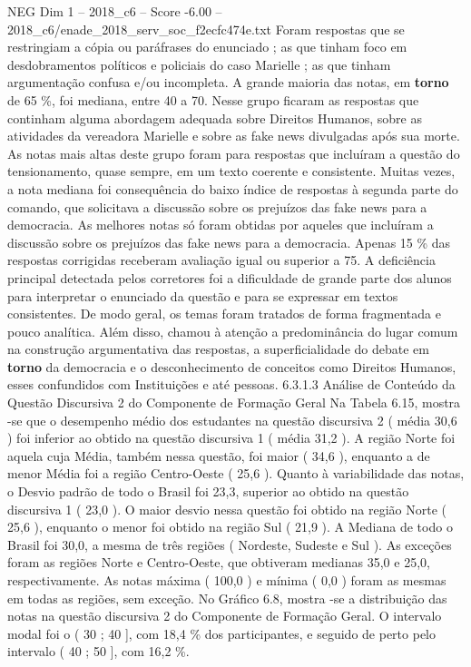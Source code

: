 \begin{textsample}{NEG Dim 1 – 2018\_c6 – Score -6.00 – 2018\_c6/enade\_2018\_serv\_soc\_f2ecfc474e.txt}
Foram respostas que se restringiam a cópia ou paráfrases do enunciado ; as que tinham foco em desdobramentos políticos e policiais do caso Marielle ; as que tinham argumentação confusa e/ou incompleta.
A grande maioria das notas, em \textbf{torno} de 65 \%, foi mediana, entre 40 a 70.
Nesse grupo ficaram as respostas que continham alguma abordagem adequada sobre Direitos Humanos, sobre as atividades da vereadora Marielle e sobre as fake news divulgadas após sua morte.
As notas mais altas deste grupo foram para respostas que incluíram a questão do tensionamento, quase sempre, em um texto coerente e consistente.
Muitas vezes, a nota mediana foi consequência do baixo índice de respostas à segunda parte do comando, que solicitava a discussão sobre os prejuízos das fake news para a democracia.
As melhores notas só foram obtidas por aqueles que incluíram a discussão sobre os prejuízos das fake news para a democracia.
Apenas 15 \% das respostas corrigidas receberam avaliação igual ou superior a 75.
A deficiência principal detectada pelos corretores foi a dificuldade de grande parte dos alunos para interpretar o enunciado da questão e para se expressar em textos consistentes.
De modo geral, os temas foram tratados de forma fragmentada e pouco analítica.
Além disso, chamou à atenção a predominância do lugar comum na construção argumentativa das respostas, a superficialidade do debate em \textbf{torno} da democracia e o desconhecimento de conceitos como Direitos Humanos, esses confundidos com Instituições e até pessoas. 6.3.1.3 Análise de Conteúdo da Questão Discursiva 2 do Componente de Formação Geral Na Tabela 6.15, mostra -se que o desempenho médio dos estudantes na questão discursiva 2 ( média 30,6 ) foi inferior ao obtido na questão discursiva 1 ( média 31,2 ).
A região Norte foi aquela cuja Média, também nessa questão, foi maior ( 34,6 ), enquanto a de menor Média foi a região Centro-Oeste ( 25,6 ).
Quanto à variabilidade das notas, o Desvio padrão de todo o Brasil foi 23,3, superior ao obtido na questão discursiva 1 ( 23,0 ).
O maior desvio nessa questão foi obtido na região Norte ( 25,6 ), enquanto o menor foi obtido na região Sul ( 21,9 ).
A Mediana de todo o Brasil foi 30,0, a mesma de três regiões ( Nordeste, Sudeste e Sul ).
As exceções foram as regiões Norte e Centro-Oeste, que obtiveram medianas 35,0 e 25,0, respectivamente.
As notas máxima ( 100,0 ) e mínima ( 0,0 ) foram as mesmas em todas as regiões, sem exceção.
No Gráfico 6.8, mostra -se a distribuição das notas na questão discursiva 2 do Componente de Formação Geral.
O intervalo modal foi o ( 30 ; 40 ], com 18,4 \% dos participantes, e seguido de perto pelo intervalo ( 40 ; 50 ], com 16,2 \%.

\end{textsample}
